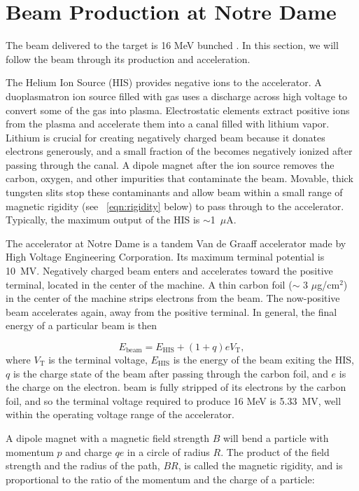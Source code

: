 \section{Beam Production at Notre Dame}
\label{sec:beamProduction}

The beam delivered to the target is 16 MeV bunched .  In this section, we will follow the beam through its production and acceleration.

The Helium Ion Source (HIS) provides negative  ions to the accelerator.  A duoplasmatron ion source filled with  gas uses a discharge across high voltage to convert some of the gas into plasma.  Electrostatic elements extract positive  ions from the plasma and accelerate them into a canal filled with lithium vapor.  Lithium is crucial for creating negatively charged beam because it donates electrons generously, and a small fraction of the  becomes negatively ionized after passing through the canal.  A dipole magnet after the ion source removes the carbon, oxygen, and other impurities that contaminate the  beam.  Movable, thick tungsten slits stop these contaminants and allow beam within a small range of magnetic rigidity (see {\eqn}~\ref{eqn:rigidity} below) to pass through to the accelerator.  Typically, the maximum output of the HIS is $\sim$1~$\mu$A.

The accelerator at Notre Dame is a tandem Van de Graaff accelerator made by High Voltage Engineering Corporation.  Its maximum terminal potential is 10~MV.  Negatively charged beam enters and accelerates toward the positive terminal, located in the center of the machine. A thin carbon foil ($\sim$ 3 $\mu$g/cm$^2$) in the center of the machine strips electrons from the beam.  The now-positive beam accelerates again, away from the positive terminal. In general, the final energy of a particular beam is then

\begin{equation}
E_{\text{beam}} = E_{\text{HIS}} + (1+q)eV_{\text{T}},
\label{eqn:beamEnergy}
\end{equation}
where $V_{\text{T}}$ is the terminal voltage, $E_{\text{HIS}}$ is the energy of the beam exiting the HIS, $q$ is the charge state of the beam after passing through the carbon foil, and $e$ is the charge on the electron.   beam is fully stripped of its electrons by the carbon foil, and so the terminal voltage required to produce 16 MeV  is 5.33~MV, well within the operating voltage range of the accelerator.    

A dipole magnet with a magnetic field strength $B$ will bend a particle with momentum $p$ and charge $qe$ in a circle of radius $R$.  The product of the field strength and the radius of the path, $BR$, is called the magnetic rigidity, and is proportional to the ratio of the momentum and the charge of a particle:

